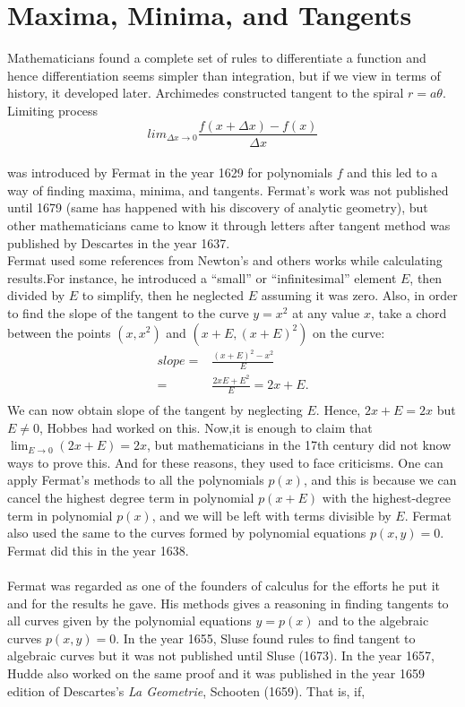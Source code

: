 \documentclass[a4paper,reqno,11pt]{amsart}
\theoremstyle{plain}%
\begin{document}
\section{Maxima, Minima, and Tangents}
Mathematicians found a complete set of rules to differentiate a function and hence differentiation seems simpler than integration, but if we view in terms of history, it developed later. Archimedes constructed tangent to the spiral $r = a\theta$. Limiting process\\
$$lim_{\Delta x\to0} \frac{f(x + \Delta x) - f(x)}{\Delta x}$$
\\
was introduced by Fermat in the year 1629 for polynomials $f$ and this led to a way of finding maxima, minima, and tangents. Fermat’s work was not published until 1679 (same has happened with his discovery of analytic geometry), but other mathematicians came to know it through letters after tangent method was published by Descartes in the year 1637.\\
\indent Fermat used some references from Newton's and others works while calculating results.For instance, he introduced a “small” or “infinitesimal” element $E$, then divided by $E$ to simplify, then he neglected $E$ assuming it was zero. Also, in order to find the slope of the tangent to the curve $y = x^2$ at any value $x$, take a chord between the points $(x, x^2)$ and $(x + E,(x + E)^2)$ on the curve:\\
\begin{align*}
slope =& \frac{(x+E)^2 - x^2}{E}\\
=& \frac{2xE + E^2}{E} = 2x + E.\\
\end{align*}
We can now obtain slope of the tangent by neglecting $E$.  Hence, $2x + E = 2x$ but $E \neq 0$, Hobbes had worked on this. Now,it is enough to claim that
$\lim_{E\to0} (2x + E) = 2x$, but mathematicians in the 17th century did not know ways to prove this. And for these reasons, they used to face criticisms. One can apply Fermat’s methods to all the polynomials $p(x)$, and this is because we can cancel the highest degree term in polynomial $p(x + E)$ with the highest-degree term in polynomial $p(x)$, and we will be left with terms divisible by $E$. Fermat also used the same to the curves formed by polynomial equations $p(x, y) = 0$. Fermat did this in the year 1638.\\
\\
\indent Fermat was regarded as one of the founders of calculus for the efforts he put it and for the results he gave. His methods gives a reasoning in finding tangents to all curves given by the polynomial equations $y = p(x)$ and to the algebraic curves $p(x, y) = 0$. In the year 1655, Sluse found rules to find tangent to algebraic curves but it was not published until Sluse (1673). In the year 1657, Hudde also worked on the same proof and it was published in the year 1659 edition of Descartes’s \textit{La Geometrie}, Schooten (1659). That is, if,\\
\end{document}
